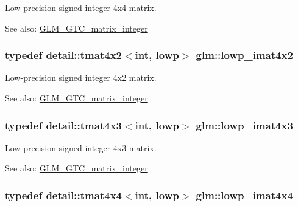 Low-precision signed integer 4x4 matrix. \begin{Desc}
\item[See also:]\hyperlink{group__gtc__matrix__integer}{GLM\_\-GTC\_\-matrix\_\-integer} \end{Desc}
\hypertarget{group__gtc__matrix__integer_g0d7055814ab969df3b844ba9c52dbf61}{
\subsubsection[lowp\_\-imat4x2]{\setlength{\rightskip}{0pt plus 5cm}typedef detail::tmat4x2$<$int, lowp$>$ {\bf glm::lowp\_\-imat4x2}}}
\label{group__gtc__matrix__integer_g0d7055814ab969df3b844ba9c52dbf61}


Low-precision signed integer 4x2 matrix. \begin{Desc}
\item[See also:]\hyperlink{group__gtc__matrix__integer}{GLM\_\-GTC\_\-matrix\_\-integer} \end{Desc}
\hypertarget{group__gtc__matrix__integer_g73858cf965b0aa7e72908eb817c192d6}{
\subsubsection[lowp\_\-imat4x3]{\setlength{\rightskip}{0pt plus 5cm}typedef detail::tmat4x3$<$int, lowp$>$ {\bf glm::lowp\_\-imat4x3}}}
\label{group__gtc__matrix__integer_g73858cf965b0aa7e72908eb817c192d6}


Low-precision signed integer 4x3 matrix. \begin{Desc}
\item[See also:]\hyperlink{group__gtc__matrix__integer}{GLM\_\-GTC\_\-matrix\_\-integer} \end{Desc}
\hypertarget{group__gtc__matrix__integer_g92339a0b053a721e3b88267e6d175014}{
\subsubsection[lowp\_\-imat4x4]{\setlength{\rightskip}{0pt plus 5cm}typedef detail::tmat4x4$<$int, lowp$>$ {\bf glm::lowp\_\-imat4x4}}}
\label{group__gtc__matrix__integer_g92339a0b053a721e3b88267e6d175014}


